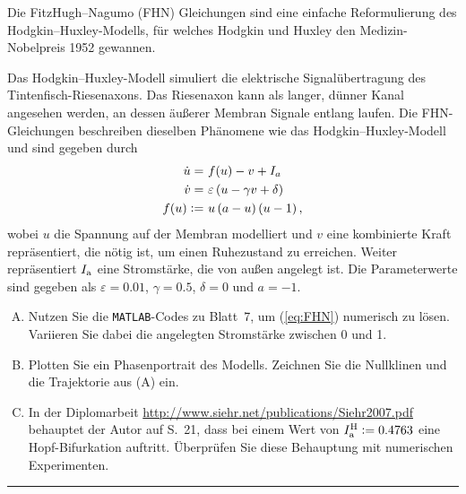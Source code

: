 \documentclass[11pt,a4paper]{article}
\begin{document}
\begin{aufg}
 Die FitzHugh--Nagumo (FHN) Gleichungen sind eine einfache Reformulierung des
 Hodgkin--Huxley-Modells, f\"ur welches Hodgkin und Huxley
 den Medizin-Nobelpreis 1952 gewannen.
 
 Das Hodgkin--Huxley-Modell simuliert die
 elektrische Signalübertragung des Tintenfisch-Riesenaxons.
 Das Riesenaxon kann als langer, dünner Kanal angesehen werden, an dessen äußerer
 Membran Signale entlang laufen. Die FHN-Gleichungen beschreiben dieselben
 Phänomene wie das Hodgkin--Huxley-Modell und sind gegeben durch
 \begin{align}
  \dot{u}      =&\ f(u) - v + I_a\notag\\
  \dot{v}      =&\ \varepsilon \left(u - \gamma v + \delta\right)\label{eq:FHN}\\
  f(u) \coloneqq&\ u\left(a-u\right)\left(u-1\right)\notag,
\end{align}
wobei $u$ die Spannung auf der Membran modelliert und $v$ eine kombinierte Kraft
repräsentiert, die nötig ist, um einen Ruhezustand zu erreichen. Weiter repräsentiert
$I_{\rm a}$ eine Stromstärke, die von außen angelegt ist.
Die Parameterwerte sind gegeben als $\varepsilon = 0.01$, $\gamma = 0.5$,
$\delta = 0$ und $a = -1$.

\begin{enumerate}[(A)]
 \item Nutzen Sie die \texttt{MATLAB}-Codes zu Blatt~7, um (\ref{eq:FHN})
       numerisch zu lösen. Variieren Sie dabei die angelegten Stromstärke
       zwischen 0 und 1.
 \item Plotten Sie ein Phasenportrait des Modells. Zeichnen Sie
       die Nullklinen und die Trajektorie aus (A) ein.
 \item In der Diplomarbeit \url{http://www.siehr.net/publications/Siehr2007.pdf}
       behauptet der Autor auf S.~21, dass bei einem Wert von
       $I_{\rm a}^{\rm H} \coloneqq 0.4763$ eine Hopf-Bifurkation auftritt.
       Überprüfen Sie diese Behauptung mit numerischen Experimenten.
\end{enumerate}
\end{aufg}

\bigskip
\hrule

\end{document}
